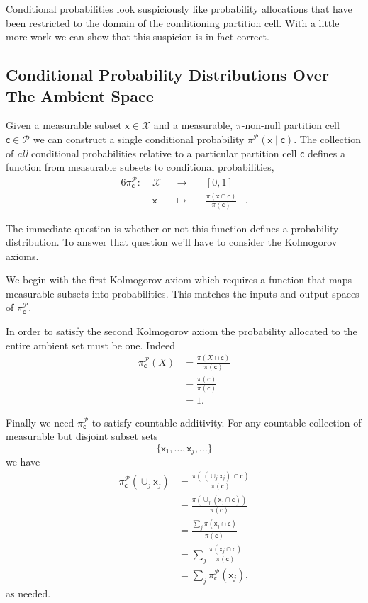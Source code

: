 \documentclass[
  letterpaper,
  DIV=11,
  numbers=noendperiod]{scrartcl}
\begin{document}
Conditional probabilities look suspiciously like probability allocations
that have been restricted to the domain of the conditioning partition
cell. With a little more work we can show that this suspicion is in fact
correct.

\subsection{Conditional Probability Distributions Over The Ambient
Space}\label{conditional-probability-distributions-over-the-ambient-space}

Given a measurable subset \(\mathsf{x} \in \mathcal{X}\) and a
measurable, \(\pi\)-non-null partition cell
\(\mathsf{c} \in \mathcal{P}\) we can construct a single conditional
probability \(\pi^{\mathcal{P}}( \mathsf{x} \mid \mathsf{c})\). The
collection of \emph{all} conditional probabilities relative to a
particular partition cell \(\mathsf{c}\) defines a function from
measurable subsets to conditional probabilities, \begin{alignat*}{6}
\pi^{\mathcal{P}}_{\mathsf{c}}
:\; &\mathcal{X}& &\rightarrow& \; &[0, 1]&
\\
&\mathsf{x} & &\mapsto&
&\frac{ \pi(\mathsf{x} \cap \mathsf{c}) }{ \pi (\mathsf{c}) }&.
\end{alignat*}

The immediate question is whether or not this function defines a
probability distribution. To answer that question we'll have to consider
the Kolmogorov axioms.

We begin with the first Kolmogorov axiom which requires a function that
maps measurable subsets into probabilities. This matches the inputs and
output spaces of \(\pi^{\mathcal{P}}_{\mathsf{c}}\).

In order to satisfy the second Kolmogorov axiom the probability
allocated to the entire ambient set must be one. Indeed \begin{align*}
\pi^{\mathcal{P}}_{\mathsf{c}}( X )
&=
\frac{ \pi(X \cap \mathsf{c}) }{ \pi(\mathsf{c}) }
\\
&=
\frac{ \pi(\mathsf{c}) }{ \pi(\mathsf{c}) }
\\
&=
1.
\end{align*}

Finally we need \(\pi^{\mathcal{P}}_{\mathsf{c}}\) to satisfy countable
additivity. For any countable collection of measurable but disjoint
subset sets \[
\{ \mathsf{x}_{1}, \ldots, \mathsf{x}_{j}, \ldots \}
\] we have \begin{align*}
\pi^{\mathcal{P}}_{\mathsf{c}}( \cup_{j} \mathsf{x}_{j} )
&=
\frac{ \pi( \, (\cup_{j} \mathsf{x}_{j}) \, \cap \mathsf{c}) }
{ \pi(\mathsf{c}) }
\\
&=
\frac{ \pi( \cup_{j} (\mathsf{x}_{j} \cap \mathsf{c}) ) }
{ \pi(\mathsf{c}) }
\\
&=
\frac{ \sum_{j} \pi( \mathsf{x}_{j} \cap \mathsf{c} ) }
{ \pi(\mathsf{c}) }
\\
&=
\sum_{j} \frac{ \pi( \mathsf{x}_{j} \cap \mathsf{c} ) }
{ \pi(\mathsf{c}) }
\\
&=
\sum_{j} \pi^{\mathcal{P}}_{\mathsf{c}}( \mathsf{x}_{j} ),
\end{align*} as needed.
\end{document}
